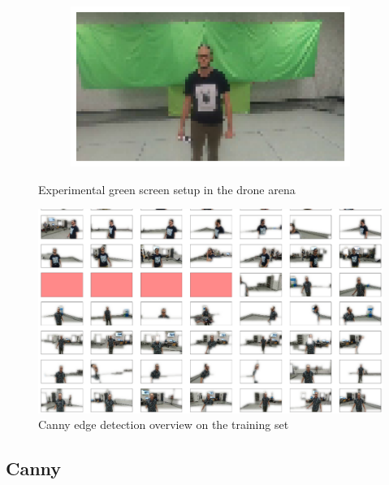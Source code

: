 \begin{figure}[!h]
\begin{center}
\begin{subfigure}[h]{0.24\textwidth}
		\end{subfigure}
		\hfill
		\begin{subfigure}[h]{0.24\textwidth}
			\centering
			\includegraphics[width=1\textwidth]{"contents/images/04-greenscreen-4"}
		\end{subfigure}
	\end{center}
	\vspace{-0.5cm}
	\caption[Experimental green screen setup in the drone arena]{Experimental green screen setup in the drone arena}
	\label{fig:greenscreen}
\end{figure}



\begin{figure}[!h]
	\centering
	\includegraphics[width=1\textwidth]{"contents/images/04-1canny-overview"}
	\caption[Canny edge detection overview on the training set]{Canny edge detection overview on the training set}
	\label{fig:canny-overview}
\end{figure}

\subsection{Canny}
\label{subsec:masking-canny}

